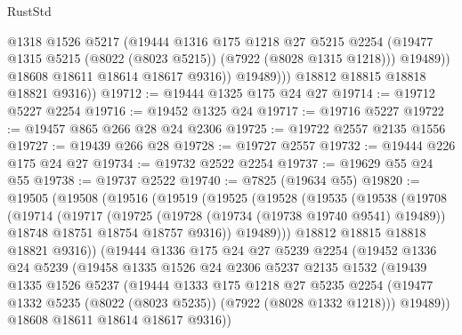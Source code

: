 \begin{lexlean}{RustStd}
\begin{coremodule}
                    @1318
                    @1526
                    @5217
                    (@19444
                      @1316
                      @175
                      @1218
                      @27
                      @5215
                      @2254
                      (@19477 @1315 @5215 (@8022 (@8023 @5215)) (@7922 (@8028 @1315 @1218)))
                      @19489))
                  @18608
                  @18611
                  @18614
                  @18617
                  @9316))
              @19489)))
        @18812
        @18815
        @18818
        @18821
        @9316))
@19712 := @19444 @1325 @175 @24 @27
@19714 := @19712 @5227 @2254
@19716 := @19452 @1325 @24
@19717 := @19716 @5227
@19722 := @19457 @865 @266 @28 @24 @2306
@19725 := @19722 @2557 @2135 @1556
@19727 := @19439 @266 @28
@19728 := @19727 @2557
@19732 := @19444 @226 @175 @24 @27
@19734 := @19732 @2522 @2254
@19737 := @19629 @55 @24 @55
@19738 := @19737 @2522
@19740 := @7825 (@19634 @55)
@19820 := @19505
    (@19508
      (@19516
        (@19519
          (@19525
            (@19528
              (@19535
                (@19538
                  (@19708
                    (@19714
                      (@19717
                        (@19725
                          (@19728 (@19734 (@19738 @19740 @9541) @19489))
                          @18748
                          @18751
                          @18754
                          @18757
                          @9316))
                      @19489)))
                @18812
                @18815
                @18818
                @18821
                @9316))
            (@19444
              @1336
              @175
              @24
              @27
              @5239
              @2254
              (@19452
                @1336
                @24
                @5239
                (@19458
                  @1335
                  @1526
                  @24
                  @2306
                  @5237
                  @2135
                  @1532
                  (@19439
                    @1335
                    @1526
                    @5237
                    (@19444
                      @1333
                      @175
                      @1218
                      @27
                      @5235
                      @2254
                      (@19477 @1332 @5235 (@8022 (@8023 @5235)) (@7922 (@8028 @1332 @1218)))
                      @19489))
                  @18608
                  @18611
                  @18614
                  @18617
                  @9316))

\end{coremodule}
\end{lexlean}
